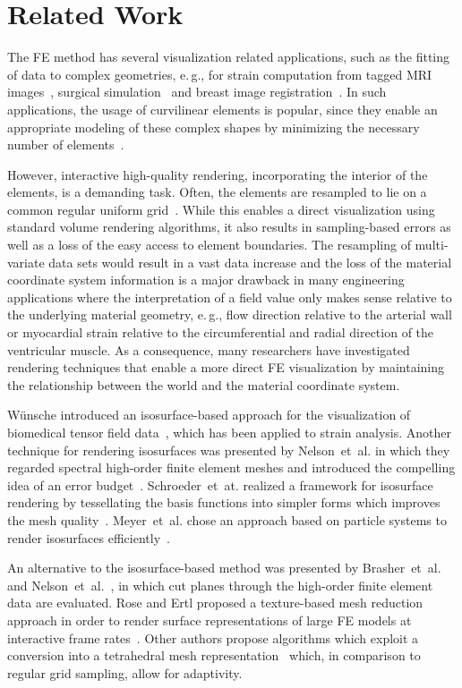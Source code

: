 \documentclass[journal]{vgtc}                %
\begin{document}
\section{Related Work}\label{sec:relatedwork}
The FE method has several visualization related applications, such as the fitting of data to complex geometries, e.\,g., for strain computation from tagged MRI images~\cite{Young00}, surgical simulation~\cite{Berkley04} and breast image registration~\cite{lee10deformation}. In such applications, the usage of curvilinear elements is popular, since they enable an appropriate modeling of these complex shapes by minimizing the necessary number of elements~\cite{gelberg90visTechGrid,smith05ventricularmechanics}.

However, interactive high-quality rendering, incorporating the interior of the elements, is a demanding task. Often, the elements are resampled to lie on a common regular uniform grid~\cite{Wihelms90}. While this enables a direct visualization using standard volume rendering algorithms, it also results in sampling-based errors as well as a loss of the easy access to element boundaries. The resampling of multi-variate data sets would result in a vast data increase and the loss of the material coordinate system information is a major drawback in many engineering applications where the interpretation of a field value only makes sense relative to the underlying material geometry, e.\,g., flow direction relative to the arterial wall or myocardial strain relative to the circumferential and radial direction of the ventricular muscle. As a consequence, many researchers have investigated rendering techniques that enable a more direct FE visualization by maintaining the relationship between the world and the material coordinate system.

W{\"u}nsche introduced an isosurface-based approach for the visualization of biomedical tensor field data~\cite{wunsche03femvis}, which has been applied to strain analysis. Another technique for rendering isosurfaces was presented by Nelson~et~al. in which they regarded spectral high-order finite element meshes and introduced the compelling idea of an error budget~\cite{nelsonhp06}. Schroeder~et~at. realized a framework for isosurface rendering by tessellating the basis functions into simpler forms which improves the mesh quality~\cite{schroeder06femtess}. Meyer~et~al. chose an approach based on particle systems to render isosurfaces efficiently~\cite{Meyer06}.

An alternative to the isosurface-based method was presented by Brasher~et~al.~\cite{brasher04} and Nelson~et~al.~\cite{nelson11}, in which cut planes through the high-order finite element data are evaluated. Rose and Ertl proposed a texture-based mesh reduction approach in order to render surface representations of large FE models at interactive frame rates~\cite{rose03femvis}. Other authors propose algorithms which exploit a conversion into a tetrahedral mesh representation~\cite{Reed95IncrementalSlicing, marmitt05femtess, Georgii06ageneric} which, in comparison to regular grid sampling, allow for adaptivity.
\end{document}
